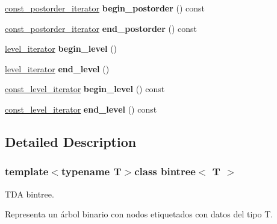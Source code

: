 \begin{DoxyCompactItemize}
\item 
\hypertarget{classbintree_abd8fb69e96f1326b8d1745ccd1833352}{\hyperlink{classbintree_1_1const__postorder__iterator}{const\+\_\+postorder\+\_\+iterator} {\bfseries begin\+\_\+postorder} () const }\label{classbintree_abd8fb69e96f1326b8d1745ccd1833352}

\item 
\hypertarget{classbintree_a1d07a09dcecab8ac31ac5978166849d3}{\hyperlink{classbintree_1_1const__postorder__iterator}{const\+\_\+postorder\+\_\+iterator} {\bfseries end\+\_\+postorder} () const }\label{classbintree_a1d07a09dcecab8ac31ac5978166849d3}

\item 
\hypertarget{classbintree_ab806982263f4c480797e3addb07d9724}{\hyperlink{classbintree_1_1level__iterator}{level\+\_\+iterator} {\bfseries begin\+\_\+level} ()}\label{classbintree_ab806982263f4c480797e3addb07d9724}

\item 
\hypertarget{classbintree_a510c30fe888aa44af32ebeeacf61e495}{\hyperlink{classbintree_1_1level__iterator}{level\+\_\+iterator} {\bfseries end\+\_\+level} ()}\label{classbintree_a510c30fe888aa44af32ebeeacf61e495}

\item 
\hypertarget{classbintree_a294c19f33a55a82e0a535a8a3cc9eb0a}{\hyperlink{classbintree_1_1const__level__iterator}{const\+\_\+level\+\_\+iterator} {\bfseries begin\+\_\+level} () const }\label{classbintree_a294c19f33a55a82e0a535a8a3cc9eb0a}

\item 
\hypertarget{classbintree_adb0cc4036c25955ed92dd421af03001b}{\hyperlink{classbintree_1_1const__level__iterator}{const\+\_\+level\+\_\+iterator} {\bfseries end\+\_\+level} () const }\label{classbintree_adb0cc4036c25955ed92dd421af03001b}

\end{DoxyCompactItemize}


\subsection{Detailed Description}
\subsubsection*{template$<$typename T$>$class bintree$<$ T $>$}

T\+D\+A bintree.

Representa un árbol binario con nodos etiquetados con datos del tipo T.

